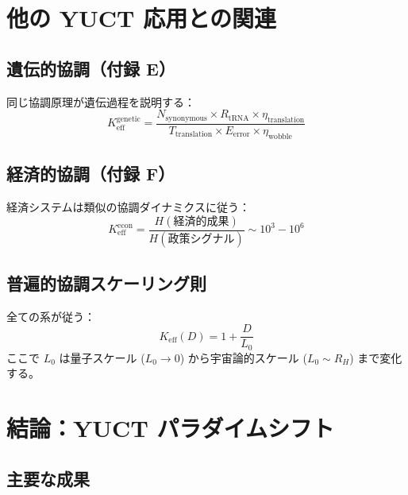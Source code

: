 \documentclass[11pt,a4paper]{article}
\theoremstyle{remark}
\newcommand{\Keff}{K_{\mathrm{eff}}}
\begin{document}
	\section{他の YUCT 応用との関連}
	\label{sec:connections}
	
	\subsection{遺伝的協調（付録 E）}
	
	同じ協調原理が遺伝過程を説明する：
	\[
	K_{\text{eff}}^{\text{genetic}} = \frac{N_{\text{synonymous}} \times R_{\text{tRNA}} \times \eta_{\text{translation}}}{T_{\text{translation}} \times E_{\text{error}} \times \eta_{\text{wobble}}}
	\]
	
	\subsection{経済的協調（付録 F）}
	
	経済システムは類似の協調ダイナミクスに従う：
	\[
	K_{\text{eff}}^{\text{econ}} = \frac{H(\text{経済的成果})}{H(\text{政策シグナル})} \sim 10^3-10^6
	\]
	
	\subsection{普遍的協調スケーリング則}
	
	全ての系が従う：
	\[
	\boxed{\Keff(D) = 1 + \frac{D}{L_0}}
	\]
	ここで $L_0$ は量子スケール ($L_0 \to 0$) から宇宙論的スケール ($L_0 \sim R_H$) まで変化する。
	
	\section{結論：YUCT パラダイムシフト}
	\label{sec:conclusion}
	
	\subsection{主要な成果}
	
\end{document}
